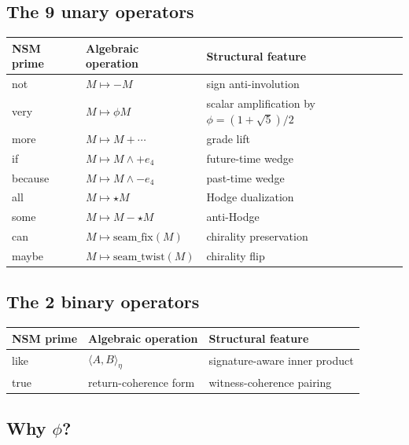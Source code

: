 \documentclass[11pt,a4paper]{article}
\theoremstyle{plain}
\theoremstyle{definition}
\theoremstyle{remark}
\numberwithin{equation}{section}
\providecommand{\seamfix}{\mathrm{seam\_fix}}
\providecommand{\seamtwist}{\mathrm{seam\_twist}}
\begin{document}
\subsection{The 9 unary operators}

\begin{center}
\begin{tabular}{lll}
\toprule
NSM prime & Algebraic operation & Structural feature \\
\midrule
\textsf{not}     & $M \mapsto -M$         & sign anti-involution \\
\textsf{very}    & $M \mapsto \phi M$     & scalar amplification by $\phi = (1+\sqrt{5})/2$ \\
\textsf{more}    & $M \mapsto M + \cdots$ & grade lift \\
\textsf{if}      & $M \mapsto M \wedge +e_4$ & future-time wedge \\
\textsf{because} & $M \mapsto M \wedge -e_4$ & past-time wedge \\
\textsf{all}     & $M \mapsto \star M$    & Hodge dualization \\
\textsf{some}    & $M \mapsto M - \star M$ & anti-Hodge \\
\textsf{can}     & $M \mapsto \seamfix(M)$ & chirality preservation \\
\textsf{maybe}   & $M \mapsto \seamtwist(M)$ & chirality flip \\
\bottomrule
\end{tabular}
\end{center}

\subsection{The 2 binary operators}

\begin{center}
\begin{tabular}{lll}
\toprule
NSM prime & Algebraic operation & Structural feature \\
\midrule
\textsf{like} & $\langle A, B \rangle_\eta$ & signature-aware inner product \\
\textsf{true} & return-coherence form & witness-coherence pairing \\
\bottomrule
\end{tabular}
\end{center}

\subsection{Why $\phi$?}
\end{document}
